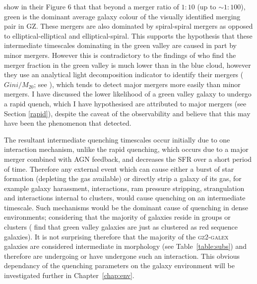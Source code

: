 \citet{Darg10a} show in their Figure 6 that that beyond a merger ratio of $1:10$ (up to $\sim 1:100$), green is the dominant average galaxy colour of the visually identified merging pair in GZ. These mergers are also dominated by spiral-spiral mergers as opposed to elliptical-elliptical and elliptical-spiral. This supports the hypothesis that these intermediate timescales dominating in the green valley are caused in part by minor mergers. However this is contradictory to the findings of \citet{Mendez11} who find the merger fraction in the green valley is much lower than in the blue cloud, however they use an analytical light decomposition indicator to identify their mergers ($Gini/M_{20}$; see \citealt{lotz08b}), which tends to detect major mergers more easily than minor mergers. I have discussed the lower likelihood of a green valley galaxy to undergo a rapid quench, which I have hypothesised are attributed to major mergers (see Section \ref{rapid}), despite the caveat of the observability and believe that this may have been the phenomenon that \citet{Mendez11} detected.

The resultant intermediate quenching timescales occur initially due to one interaction mechanism, unlike the rapid quenching, which occurs due to a major merger combined with AGN feedback, and decreases the SFR over a short period of time. Therefore any external event which can cause either a burst of star formation (depleting the gas available) or directly strip a galaxy of its gas, for example galaxy harassment, interactions, ram pressure stripping, strangulation and interactions internal to clusters, would cause quenching on an intermediate timescale. Such mechanisms would be the dominant cause of quenching in dense environments; considering that the majority of galaxies reside in groups or clusters (\citealt{Coil08} find that green valley galaxies are just as clustered as red sequence galaxies). It is not surprising therefore that the majority of the \textsc{gz2-galex} galaxies are considered intermediate in morphology (see Table~\ref{table:subs}) and therefore are undergoing or have undergone such an interaction. This obvious dependancy of the quenching parameters on the galaxy environment will be investigated further in Chapter~\ref{chap:env}.


